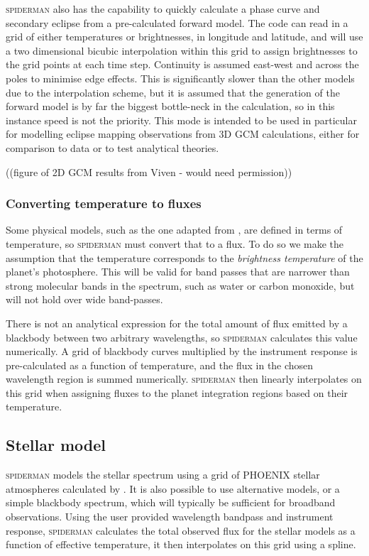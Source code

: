 \documentclass[a4paper,fleqn,usenatbib]{mnras}
\begin{document}
\textsc{spiderman} also has the capability to quickly calculate a phase curve and secondary eclipse from a pre-calculated forward model. The code can read in a grid of either temperatures or brightnesses, in longitude and latitude, and will use a two dimensional bicubic interpolation within this grid to assign brightnesses to the grid points at each time step. Continuity is assumed east-west and across the poles to minimise edge effects.
This is significantly slower than the other models due to the interpolation scheme, but it is assumed that the generation of the forward model is by far the biggest bottle-neck in the calculation, so in this instance speed is not the priority.
This mode is intended to be used in particular for modelling eclipse mapping observations from 3D GCM calculations, either for comparison to data or to test analytical theories.


((figure of 2D GCM results from Viven - would need permission))

\subsubsection{Converting temperature to fluxes}\label{sec:ttof}

Some physical models, such as the one adapted from \citep{Zhang2016}, are defined in terms of temperature, so \textsc{spiderman} must convert that to a flux. To do so we make the assumption that the temperature corresponds to the \emph{brightness temperature} of the planet's photosphere. This will be valid for band passes that are narrower than strong molecular bands in the spectrum, such as water or carbon monoxide, but will not hold over wide band-passes.

There is not an analytical expression for the total amount of flux emitted by a blackbody between two arbitrary wavelengths, so \textsc{spiderman} calculates this value numerically. A grid of blackbody curves multiplied by the instrument response is pre-calculated as a function of temperature, and the flux in the chosen wavelength region is summed numerically. \textsc{spiderman} then linearly interpolates on this grid when assigning fluxes to the planet integration regions based on their temperature.

\subsection{Stellar model}\label{sec:stellar model}

\textsc{spiderman} models the stellar spectrum using a grid of PHOENIX stellar atmospheres calculated by \citet{Husser2013}. It is also possible to use alternative models, or a simple blackbody spectrum, which will typically be sufficient for broadband observations. Using the user provided wavelength bandpass and instrument response, \textsc{spiderman} calculates the total observed flux for the stellar models as a function of effective temperature, it then interpolates on this grid using a spline.
\end{document}
